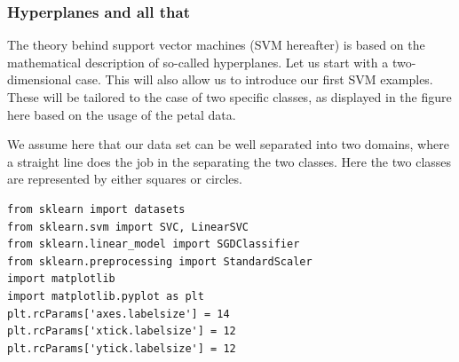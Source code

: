 \documentclass{beamer}
\begin{document}
\begin{frame}
\frametitle{Hyperplanes and all that}

The theory behind support vector machines (SVM hereafter) is based on
the mathematical description of so-called hyperplanes. Let us start
with a two-dimensional case. This will also allow us to introduce our
first SVM examples. These will be tailored to the case of two specific
classes, as displayed in the figure here based on the usage of the petal data.

We assume here that our data set can be well separated into two
domains, where a straight line does the job in the separating the two
classes. Here the two classes are represented by either squares or
circles.






































































\begin{lstlisting}
from sklearn import datasets
from sklearn.svm import SVC, LinearSVC
from sklearn.linear_model import SGDClassifier
from sklearn.preprocessing import StandardScaler
import matplotlib
import matplotlib.pyplot as plt
plt.rcParams['axes.labelsize'] = 14
plt.rcParams['xtick.labelsize'] = 12
plt.rcParams['ytick.labelsize'] = 12



\end{lstlisting}
\end{frame}
\end{document}

